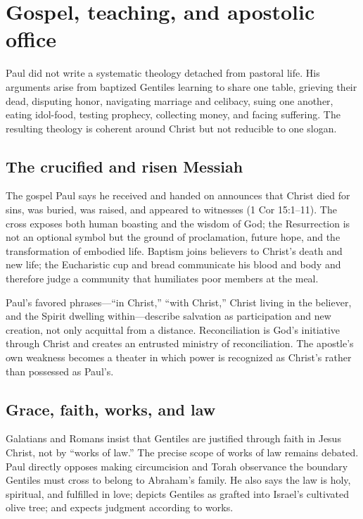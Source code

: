 \section{Gospel, teaching, and apostolic office}\label{sec:paul-teaching}

Paul did not write a systematic theology detached from pastoral life. His
arguments arise from baptized Gentiles learning to share one table, grieving
their dead, disputing honor, navigating marriage and celibacy, suing one
another, eating idol-food, testing prophecy, collecting money, and facing
suffering. The resulting theology is coherent around Christ but not reducible
to one slogan.

\subsection{The crucified and risen Messiah}

The gospel Paul says he received and handed on announces that Christ died for
sins, was buried, was raised, and appeared to witnesses (1 Cor 15:1--11). The
cross exposes both human boasting and the wisdom of God; the Resurrection is
not an optional symbol but the ground of proclamation, future hope, and the
transformation of embodied life. Baptism joins believers to Christ's death and
new life; the Eucharistic cup and bread communicate his blood and body and
therefore judge a community that humiliates poor members at the meal.

Paul's favored phrases---``in Christ,'' ``with Christ,'' Christ living in the
believer, and the Spirit dwelling within---describe salvation as participation
and new creation, not only acquittal from a distance. Reconciliation is God's
initiative through Christ and creates an entrusted ministry of
reconciliation. The apostle's own weakness becomes a theater in which power is
recognized as Christ's rather than possessed as Paul's.

\subsection{Grace, faith, works, and law}

Galatians and Romans insist that Gentiles are justified through faith in Jesus
Christ, not by ``works of law.'' The precise scope of works of law remains
debated. Paul directly opposes making
circumcision and Torah observance the boundary Gentiles must cross to belong
to Abraham's family. He also says the law is holy, spiritual, and fulfilled in
love; depicts Gentiles as grafted into Israel's cultivated olive tree; and
expects judgment according to works.

